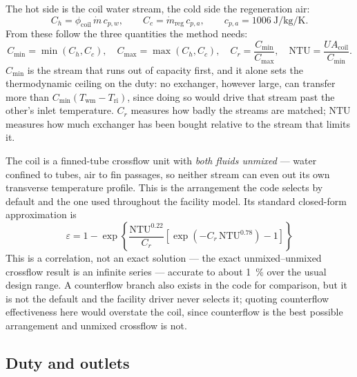 \documentclass[11pt]{article}
\newcommand{\md}{\ensuremath{\dot m}}
\newcommand{\mdr}{\ensuremath{\dot m_{\mathrm{reg}}}}
\newcommand{\UA}{\ensuremath{U\!A}}
\begin{document}
The hot side is the coil water stream, the cold side the regeneration air:
\begin{equation}
C_h=\phi_{\mathrm{coil}}\,\md\,c_{p,w},
\qquad
C_c=\mdr\,c_{p,a},
\qquad c_{p,a}=\SI{1006}{\joule\per\kilogram\per\kelvin}.
\label{eq:hyd:caprates}
\end{equation}
From these follow the three quantities the method needs:
\begin{equation}
C_{\min}=\min\left(C_h,C_c\right),\quad
C_{\max}=\max\left(C_h,C_c\right),\quad
C_r=\frac{C_{\min}}{C_{\max}},\quad
\mathrm{NTU}=\frac{\UA_{\mathrm{coil}}}{C_{\min}} .
\label{eq:hyd:ntudef}
\end{equation}
$C_{\min}$ is the stream that runs out of capacity first, and it alone sets the thermodynamic
ceiling on the duty: no exchanger, however large, can transfer more than
$C_{\min}(T_{\mathrm{wm}}-T_{\mathrm{ri}})$, since doing so would drive that stream past the
other's inlet temperature. $C_r$ measures how badly the streams are matched; $\mathrm{NTU}$
measures how much exchanger has been bought relative to the stream that limits it.

The coil is a finned-tube crossflow unit with \emph{both fluids unmixed} --- water confined to
tubes, air to fin passages, so neither stream can even out its own transverse temperature
profile. This is the arrangement the code selects by default and the one used throughout the
facility model. Its standard closed-form approximation is
\begin{equation}
\boxed{\;\varepsilon=1-\exp\!\left\{\frac{\mathrm{NTU}^{0.22}}{C_r}
\left[\exp\!\left(-C_r\,\mathrm{NTU}^{0.78}\right)-1\right]\right\}\;}
\label{eq:hyd:epscross}
\end{equation}
This is a correlation, not an exact solution --- the exact unmixed--unmixed crossflow result is
an infinite series --- accurate to about \SI{1}{\percent} over the usual design range. A
counterflow branch also exists in the code for comparison, but it is not the default and the
facility driver never selects it; quoting counterflow effectiveness here would overstate the
coil, since counterflow is the best possible arrangement and unmixed crossflow is not.

\subsection{Duty and outlets}
\label{sec:hyd:duty}
\end{document}
